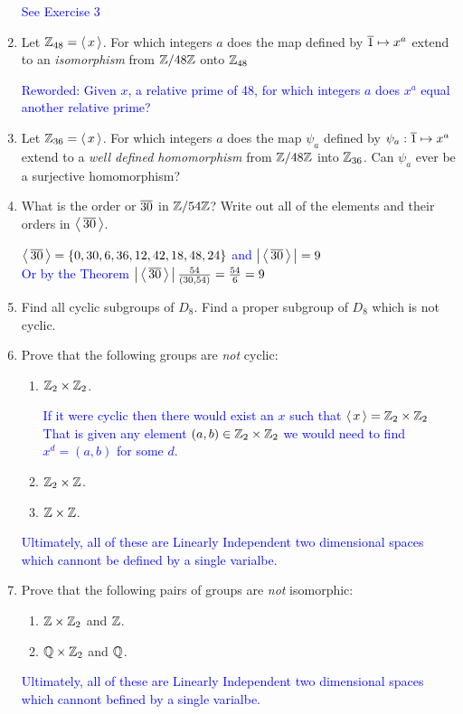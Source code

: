 \documentclass[10pt,a4paper]{report}
\newcommand{\BLUE}[1]{\textcolor{blue}{#1}}
\begin{document}
\begin{enumerate}
	\BLUE{See Exercise 3}
	
	\item Let $\mathbb{Z}_{48}=\left \langle\, x \,\right \rangle$.  For which integers $a$ does the map defined by $\overline{1}\mapsto x^a$ extend to an \textit{isomorphism} from $\mathbb{Z}/48\mathbb{Z}$ onto $\mathbb{Z}_{48}$
	
	\BLUE{Reworded: Given $x$, a relative prime of 48, for which integers $a$ does $x^a$ equal another relative prime?}
	
	\item Let $\mathbb{Z}_{36}=\left \langle\, x \,\right \rangle$.  For which integers $a$ does the map $\psi_a$ defined by $\psi_a: \overline{1}\mapsto x^a$ extend to a \textit{well defined homomorphism} from $\mathbb{Z}/48\mathbb{Z}$ into $\mathbb{Z}_{36}$. Can $\psi_a$ ever be a surjective homomorphism? 
	
	\item What is the order or $\overline{30}$ in $\mathbb{Z}/54\mathbb{Z}$?  Write out all of the elements and their orders in $\left \langle\, \overline{30} \,\right \rangle$.
	
	\BLUE{$\left \langle\, \overline{30} \,\right \rangle = \{0, 30, 6, 36, 12, 42, 18, 48, 24\}$ and $\left |\, \left \langle\, \overline{30} \,\right \rangle \,\right |=9$\\
	Or by the Theorem $\left |\, \left \langle\, \overline{30} \,\right \rangle \,\right |\frac{54}{(30,54)}=\frac{54}{6}=9$
	}
	
	\item Find all cyclic subgroups of $D_8$.  Find a proper subgroup of $D_8$ which is not cyclic.
	
	\item Prove that the following groups are \textit{not} cyclic:
	\begin{enumerate}
		\item $\mathbb{Z}_2 \times \mathbb{Z}_2$.
		
		\BLUE{If it were cyclic then there would exist an $x$ such that $\left \langle\, x \,\right \rangle=\mathbb{Z}_2 \times \mathbb{Z}_2$  That is given any element $(a,b)\in\mathbb{Z}_2 \times \mathbb{Z}_2$ we would need to find $x^d=(a,b)$ for some $d$.
		}
		
		\item $\mathbb{Z}_2 \times \mathbb{Z}$.
		\item $\mathbb{Z}\times \mathbb{Z}$.
	\end{enumerate}\BLUE{Ultimately, all of these are Linearly Independent two dimensional spaces which cannont be defined by a single varialbe.}
	
	\item Prove that the following pairs of groups are \textit{not} isomorphic:
	\begin{enumerate}
		\item $\mathbb{Z}\times \mathbb{Z}_2$ and $\mathbb{Z}$.
		\item $\mathbb{Q} \times \mathbb{Z}_2$ and $\mathbb{Q}$.
	\end{enumerate}\BLUE{Ultimately, all of these are Linearly Independent two dimensional spaces which cannont befined by a single varialbe.}
	

\end{enumerate}
\end{document}

